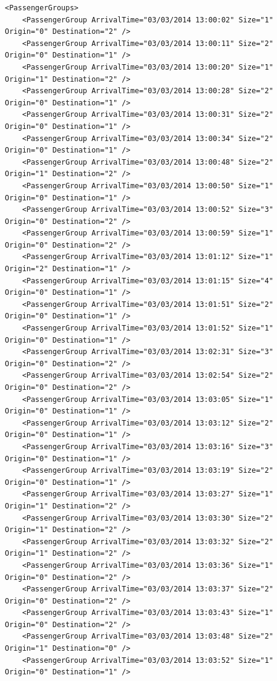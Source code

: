\documentclass{UoYCSproject}
\begin{document}
\begin{appendices}
\lstset{language=XML}
\begin{lstlisting}
<PassengerGroups>
	<PassengerGroup ArrivalTime="03/03/2014 13:00:02" Size="1" Origin="0" Destination="2" />
	<PassengerGroup ArrivalTime="03/03/2014 13:00:11" Size="2" Origin="0" Destination="1" />
	<PassengerGroup ArrivalTime="03/03/2014 13:00:20" Size="1" Origin="1" Destination="2" />
	<PassengerGroup ArrivalTime="03/03/2014 13:00:28" Size="2" Origin="0" Destination="1" />
	<PassengerGroup ArrivalTime="03/03/2014 13:00:31" Size="2" Origin="0" Destination="1" />
	<PassengerGroup ArrivalTime="03/03/2014 13:00:34" Size="2" Origin="0" Destination="1" />
	<PassengerGroup ArrivalTime="03/03/2014 13:00:48" Size="2" Origin="1" Destination="2" />
	<PassengerGroup ArrivalTime="03/03/2014 13:00:50" Size="1" Origin="0" Destination="1" />
	<PassengerGroup ArrivalTime="03/03/2014 13:00:52" Size="3" Origin="0" Destination="2" />
	<PassengerGroup ArrivalTime="03/03/2014 13:00:59" Size="1" Origin="0" Destination="2" />
	<PassengerGroup ArrivalTime="03/03/2014 13:01:12" Size="1" Origin="2" Destination="1" />
	<PassengerGroup ArrivalTime="03/03/2014 13:01:15" Size="4" Origin="0" Destination="1" />
	<PassengerGroup ArrivalTime="03/03/2014 13:01:51" Size="2" Origin="0" Destination="1" />
	<PassengerGroup ArrivalTime="03/03/2014 13:01:52" Size="1" Origin="0" Destination="1" />
	<PassengerGroup ArrivalTime="03/03/2014 13:02:31" Size="3" Origin="0" Destination="2" />
	<PassengerGroup ArrivalTime="03/03/2014 13:02:54" Size="2" Origin="0" Destination="2" />
	<PassengerGroup ArrivalTime="03/03/2014 13:03:05" Size="1" Origin="0" Destination="1" />
	<PassengerGroup ArrivalTime="03/03/2014 13:03:12" Size="2" Origin="0" Destination="1" />
	<PassengerGroup ArrivalTime="03/03/2014 13:03:16" Size="3" Origin="0" Destination="1" />
	<PassengerGroup ArrivalTime="03/03/2014 13:03:19" Size="2" Origin="0" Destination="1" />
	<PassengerGroup ArrivalTime="03/03/2014 13:03:27" Size="1" Origin="1" Destination="2" />
	<PassengerGroup ArrivalTime="03/03/2014 13:03:30" Size="2" Origin="1" Destination="2" />
	<PassengerGroup ArrivalTime="03/03/2014 13:03:32" Size="2" Origin="1" Destination="2" />
	<PassengerGroup ArrivalTime="03/03/2014 13:03:36" Size="1" Origin="0" Destination="2" />
	<PassengerGroup ArrivalTime="03/03/2014 13:03:37" Size="2" Origin="0" Destination="2" />
	<PassengerGroup ArrivalTime="03/03/2014 13:03:43" Size="1" Origin="0" Destination="2" />
	<PassengerGroup ArrivalTime="03/03/2014 13:03:48" Size="2" Origin="1" Destination="0" />
	<PassengerGroup ArrivalTime="03/03/2014 13:03:52" Size="1" Origin="0" Destination="1" />

\end{lstlisting}
\end{appendices}
\end{document}
